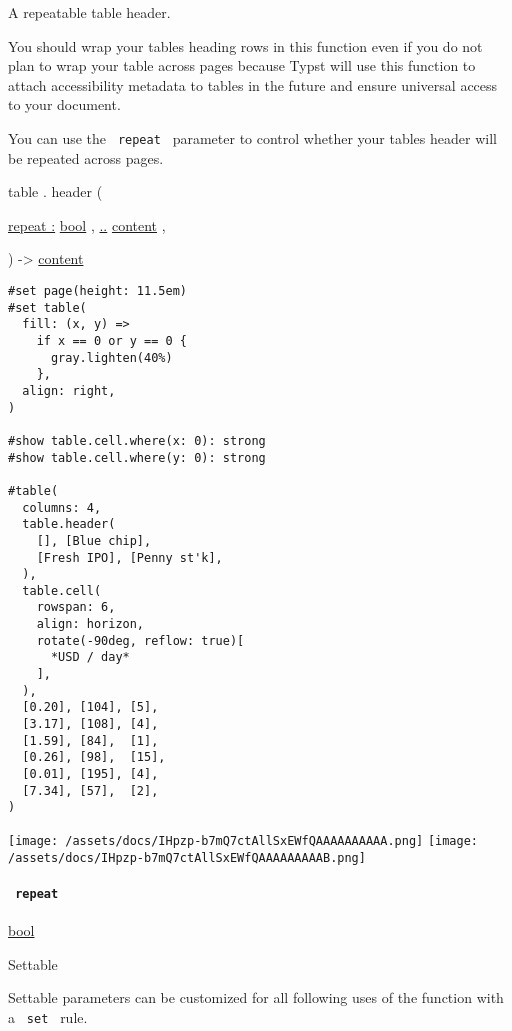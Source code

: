 A repeatable table header.

You should wrap your tables\textquotesingle{} heading rows in this
function even if you do not plan to wrap your table across pages because
Typst will use this function to attach accessibility metadata to tables
in the future and ensure universal access to your document.

You can use the \texttt{\ repeat\ } parameter to control whether your
table\textquotesingle s header will be repeated across pages.

table { . } { header } (

{ \hyperref[definitions-header-parameters-repeat]{repeat :}
\href{/docs/reference/foundations/bool/}{bool} , } {
\hyperref[definitions-header-parameters-children]{..}
\href{/docs/reference/foundations/content/}{content} , }

) -\textgreater{} \href{/docs/reference/foundations/content/}{content}

\begin{verbatim}
#set page(height: 11.5em)
#set table(
  fill: (x, y) =>
    if x == 0 or y == 0 {
      gray.lighten(40%)
    },
  align: right,
)

#show table.cell.where(x: 0): strong
#show table.cell.where(y: 0): strong

#table(
  columns: 4,
  table.header(
    [], [Blue chip],
    [Fresh IPO], [Penny st'k],
  ),
  table.cell(
    rowspan: 6,
    align: horizon,
    rotate(-90deg, reflow: true)[
      *USD / day*
    ],
  ),
  [0.20], [104], [5],
  [3.17], [108], [4],
  [1.59], [84],  [1],
  [0.26], [98],  [15],
  [0.01], [195], [4],
  [7.34], [57],  [2],
)
\end{verbatim}

\texttt{[image: /assets/docs/IHpzp-b7mQ7ctAllSxEWfQAAAAAAAAAA.png]}
\texttt{[image: /assets/docs/IHpzp-b7mQ7ctAllSxEWfQAAAAAAAAAB.png]}

\paragraph{\texorpdfstring{\texttt{\ repeat\ }}{ repeat }}\label{definitions-header-repeat}

\href{/docs/reference/foundations/bool/}{bool}

{{ Settable }}

\label{definitions-header-repeat-settable-tooltip}
Settable parameters can be customized for all following uses of the
function with a \texttt{\ set\ } rule.

